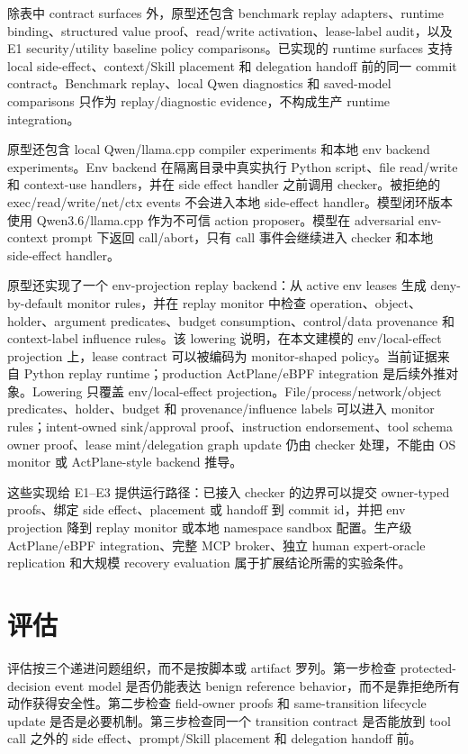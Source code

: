 \documentclass[UTF8,a4paper,11pt]{ctexart}
\begin{document}
除表中 contract surfaces 外，原型还包含 benchmark replay adapters、runtime binding、structured value proof、read/write activation、lease-label audit，以及 E1 security/utility baseline policy comparisons。已实现的 runtime surfaces 支持 local side-effect、context/Skill placement 和 delegation handoff 前的同一 commit contract。Benchmark replay、local Qwen diagnostics 和 saved-model comparisons 只作为 replay/diagnostic evidence，不构成生产 runtime integration。

原型还包含 local Qwen/llama.cpp compiler experiments 和本地 env backend experiments。Env backend 在隔离目录中真实执行 Python script、file read/write 和 context-use handlers，并在 side effect handler 之前调用 checker。被拒绝的 exec/read/write/net/ctx events 不会进入本地 side-effect handler。模型闭环版本使用 Qwen3.6/llama.cpp 作为不可信 action proposer。模型在 adversarial env-context prompt 下返回 call/abort，只有 call 事件会继续进入 checker 和本地 side-effect handler。

原型还实现了一个 env-projection replay backend：从 active env leases 生成 deny-by-default monitor rules，并在 replay monitor 中检查 operation、object、holder、argument predicates、budget consumption、control/data provenance 和 context-label influence rules。该 lowering 说明，在本文建模的 env/local-effect projection 上，lease contract 可以被编码为 monitor-shaped policy。当前证据来自 Python replay runtime；production ActPlane/eBPF integration 是后续外推对象。Lowering 只覆盖 env/local-effect projection。File/process/network/object predicates、holder、budget 和 provenance/influence labels 可以进入 monitor rules；intent-owned sink/approval proof、instruction endorsement、tool schema owner proof、lease mint/delegation graph update 仍由 checker 处理，不能由 OS monitor 或 ActPlane-style backend 推导。

这些实现给 E1--E3 提供运行路径：已接入 checker 的边界可以提交 owner-typed proofs、绑定 side effect、placement 或 handoff 到 commit id，并把 env projection 降到 replay monitor 或本地 namespace sandbox 配置。生产级 ActPlane/eBPF integration、完整 MCP broker、独立 human expert-oracle replication 和大规模 recovery evaluation 属于扩展结论所需的实验条件。

\section{评估}
\label{sec:evaluation}

评估按三个递进问题组织，而不是按脚本或 artifact 罗列。第一步检查 protected-decision event model 是否仍能表达 benign reference behavior，而不是靠拒绝所有动作获得安全性。第二步检查 field-owner proofs 和 same-transition lifecycle update 是否是必要机制。第三步检查同一个 transition contract 是否能放到 tool call 之外的 side effect、prompt/Skill placement 和 delegation handoff 前。
\end{document}
